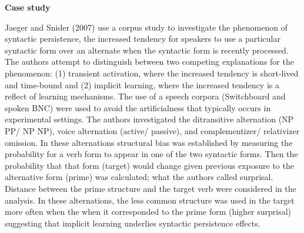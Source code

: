 \documentclass[
  letterpaper,
]{latex/krantz}
\begin{document}
\begin{tcolorbox}[enhanced jigsaw, colframe=quarto-callout-caution-color-frame, titlerule=0mm, coltitle=black, colback=white, opacitybacktitle=0.6, colbacktitle=quarto-callout-caution-color!10!white, left=2mm, arc=.35mm, leftrule=.75mm, rightrule=.15mm, bottomtitle=1mm, toptitle=1mm, breakable, bottomrule=.15mm, title=\textcolor{quarto-callout-caution-color}{\faFire}\hspace{0.5em}{Caution}, toprule=.15mm, opacityback=0]

\textbf{Case study}

Jaeger and Snider (2007) use a corpus study to investigate the
phenomenon of syntactic persistence, the increased tendency for speakers
to use a particular syntactic form over an alternate when the syntactic
form is recently processed. The authors attempt to distinguish between
two competing explanations for the phenomenon: (1) transient activation,
where the increased tendency is short-lived and time-bound and (2)
implicit learning, where the increased tendency is a reflect of learning
mechanisms. The use of a speech corpora (Switchboard and spoken BNC)
were used to avoid the artificialness that typically occurs in
experimental settings. The authors investigated the ditransitive
alternation (NP PP/ NP NP), voice alternation (active/ passive), and
complementizer/ relativizer omission. In these alternations structural
bias was established by measuring the probability for a verb form to
appear in one of the two syntactic forms. Then the probability that that
form (target) would change given previous exposure to the alternative
form (prime) was calculated; what the authors called surprisal. Distance
between the prime structure and the target verb were considered in the
analysis. In these alternations, the less common structure was used in
the target more often when the when it corresponded to the prime form
(higher surprisal) suggesting that implicit learning underlies syntactic
persistence effects.

\end{tcolorbox}
\end{document}
